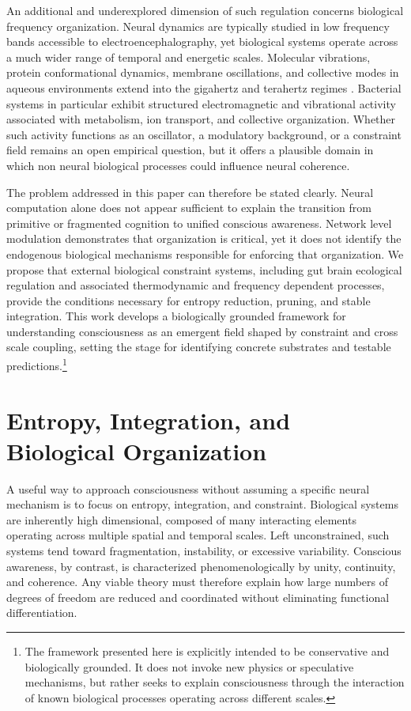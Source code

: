 \documentclass[12pt,letterpaper]{article}
\begin{document}
An additional and underexplored dimension of such regulation concerns biological frequency organization. Neural dynamics are typically studied in low frequency bands accessible to electroencephalography, yet biological systems operate across a much wider range of temporal and energetic scales. Molecular vibrations, protein conformational dynamics, membrane oscillations, and collective modes in aqueous environments extend into the gigahertz and terahertz regimes \cite{froehlich1968, pokorny2004}. Bacterial systems in particular exhibit structured electromagnetic and vibrational activity associated with metabolism, ion transport, and collective organization. Whether such activity functions as an oscillator, a modulatory background, or a constraint field remains an open empirical question, but it offers a plausible domain in which non neural biological processes could influence neural coherence.

The problem addressed in this paper can therefore be stated clearly. Neural computation alone does not appear sufficient to explain the transition from primitive or fragmented cognition to unified conscious awareness. Network level modulation demonstrates that organization is critical, yet it does not identify the endogenous biological mechanisms responsible for enforcing that organization. We propose that external biological constraint systems, including gut brain ecological regulation and associated thermodynamic and frequency dependent processes, provide the conditions necessary for entropy reduction, pruning, and stable integration. This work develops a biologically grounded framework for understanding consciousness as an emergent field shaped by constraint and cross scale coupling, setting the stage for identifying concrete substrates and testable predictions.\footnote{The framework presented here is explicitly intended to be conservative and biologically grounded. It does not invoke new physics or speculative mechanisms, but rather seeks to explain consciousness through the interaction of known biological processes operating across different scales.}

\section{Entropy, Integration, and Biological Organization}

A useful way to approach consciousness without assuming a specific neural mechanism is to focus on entropy, integration, and constraint. Biological systems are inherently high dimensional, composed of many interacting elements operating across multiple spatial and temporal scales. Left unconstrained, such systems tend toward fragmentation, instability, or excessive variability. Conscious awareness, by contrast, is characterized phenomenologically by unity, continuity, and coherence. Any viable theory must therefore explain how large numbers of degrees of freedom are reduced and coordinated without eliminating functional differentiation.
\end{document}
